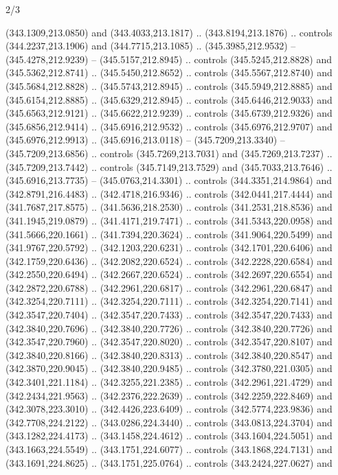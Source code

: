 \begin{flagdescription}{2/3}
\begin{scope}[xshift=0.5\flaglength,yshift=0.5\flagwidth,scale=\flagwidth/495.65]
\begin{scope}[y=0.8pt, x=0.8pt, yscale=-1,shift={(-463.76,-309.78)}]
  (343.1309,213.0850) and (343.4033,213.1817) .. (343.8194,213.1876) .. controls
  (344.2237,213.1906) and (344.7715,213.1085) .. (345.3985,212.9532) --
  (345.4278,212.9239) -- (345.5157,212.8945) .. controls (345.5245,212.8828) and
  (345.5362,212.8741) .. (345.5450,212.8652) .. controls (345.5567,212.8740) and
  (345.5684,212.8828) .. (345.5743,212.8945) .. controls (345.5949,212.8885) and
  (345.6154,212.8885) .. (345.6329,212.8945) .. controls (345.6446,212.9033) and
  (345.6563,212.9121) .. (345.6622,212.9239) .. controls (345.6739,212.9326) and
  (345.6856,212.9414) .. (345.6916,212.9532) .. controls (345.6976,212.9707) and
  (345.6976,212.9913) .. (345.6916,213.0118) -- (345.7209,213.3340) --
  (345.7209,213.6856) .. controls (345.7269,213.7031) and (345.7269,213.7237) ..
  (345.7209,213.7442) .. controls (345.7149,213.7529) and (345.7033,213.7646) ..
  (345.6916,213.7735) -- (345.0763,214.3301) .. controls (344.3351,214.9864) and
  (342.8791,216.4483) .. (342.4718,216.9346) .. controls (342.0441,217.4444) and
  (341.7687,217.8575) .. (341.5636,218.2530) .. controls (341.2531,218.8536) and
  (341.1945,219.0879) .. (341.4171,219.7471) .. controls (341.5343,220.0958) and
  (341.5666,220.1661) .. (341.7394,220.3624) .. controls (341.9064,220.5499) and
  (341.9767,220.5792) .. (342.1203,220.6231) .. controls (342.1701,220.6406) and
  (342.1759,220.6436) .. (342.2082,220.6524) .. controls (342.2228,220.6584) and
  (342.2550,220.6494) .. (342.2667,220.6524) .. controls (342.2697,220.6554) and
  (342.2872,220.6788) .. (342.2961,220.6817) .. controls (342.2961,220.6847) and
  (342.3254,220.7111) .. (342.3254,220.7111) .. controls (342.3254,220.7141) and
  (342.3547,220.7404) .. (342.3547,220.7433) .. controls (342.3547,220.7433) and
  (342.3840,220.7696) .. (342.3840,220.7726) .. controls (342.3840,220.7726) and
  (342.3547,220.7960) .. (342.3547,220.8020) .. controls (342.3547,220.8107) and
  (342.3840,220.8166) .. (342.3840,220.8313) .. controls (342.3840,220.8547) and
  (342.3870,220.9045) .. (342.3840,220.9485) .. controls (342.3780,221.0305) and
  (342.3401,221.1184) .. (342.3255,221.2385) .. controls (342.2961,221.4729) and
  (342.2434,221.9563) .. (342.2376,222.2639) .. controls (342.2259,222.8469) and
  (342.3078,223.3010) .. (342.4426,223.6409) .. controls (342.5774,223.9836) and
  (342.7708,224.2122) .. (343.0286,224.3440) .. controls (343.0813,224.3704) and
  (343.1282,224.4173) .. (343.1458,224.4612) .. controls (343.1604,224.5051) and
  (343.1663,224.5549) .. (343.1751,224.6077) .. controls (343.1868,224.7131) and
  (343.1691,224.8625) .. (343.1751,225.0764) .. controls (343.2424,227.0627) and

\end{scope}
\end{scope}
\end{flagdescription}
